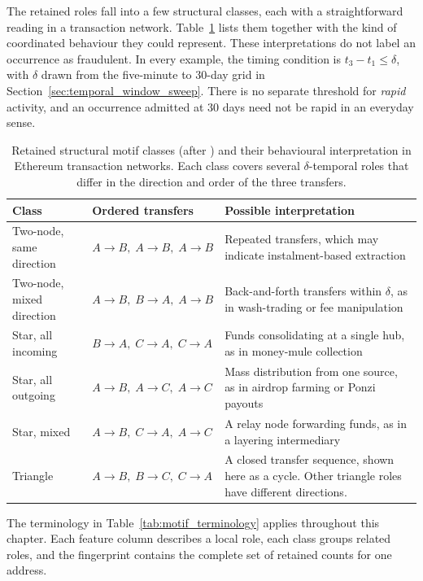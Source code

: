 The retained roles fall into a few structural classes, each with a
straightforward reading in a transaction network.
Table~\ref{tab:motif_classes} lists them together with the kind of coordinated
behaviour they could represent. These interpretations do not label an occurrence
as fraudulent. In every example, the timing condition is
$t_3-t_1 \leq \delta$, with $\delta$ drawn from the five-minute to 30-day grid
in Section~\ref{sec:temporal_window_sweep}. There is no separate threshold for
\emph{rapid} activity, and an occurrence admitted at 30 days need not be rapid in
an everyday sense.

\begin{table}[h]
\centering
\caption{Retained structural motif classes (after \citet{paranjape2017motifs})
and their behavioural interpretation in Ethereum transaction networks. Each
class covers several $\delta$-temporal roles that differ in the direction and
order of the three transfers.}
\label{tab:motif_classes}
\begin{tabular}{p{3.5cm} p{4.5cm} p{5cm}}
\toprule
\textbf{Class} & \textbf{Ordered transfers} & \textbf{Possible interpretation} \\
\midrule
Two-node, same direction &
    $A \to B,\; A \to B,\; A \to B$ &
    Repeated transfers, which may indicate instalment-based extraction \\[4pt]
Two-node, mixed direction &
    $A \to B,\; B \to A,\; A \to B$ &
    Back-and-forth transfers within $\delta$, as in wash-trading or fee manipulation \\[4pt]
Star, all incoming &
    $B \to A,\; C \to A,\; C \to A$ &
    Funds consolidating at a single hub, as in money-mule collection \\[4pt]
Star, all outgoing &
    $A \to B,\; A \to C,\; A \to C$ &
    Mass distribution from one source, as in airdrop farming or Ponzi payouts \\[4pt]
Star, mixed &
    $A \to B,\; C \to A,\; A \to C$ &
    A relay node forwarding funds, as in a layering intermediary \\[4pt]
Triangle &
    $A \to B,\; B \to C,\; C \to A$ &
    A closed transfer sequence, shown here as a cycle. Other triangle roles
    have different directions. \\
\bottomrule
\end{tabular}
\end{table}

The terminology in Table~\ref{tab:motif_terminology} applies throughout this
chapter. Each feature column describes a local role, each class groups related
roles, and the fingerprint contains the complete set of retained counts for
one address.

